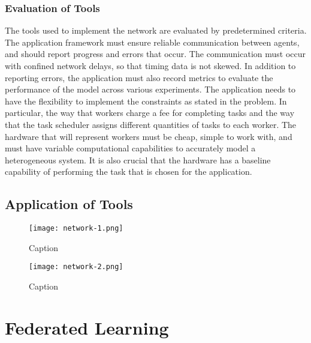 \documentclass[../mthe-493-final-project.tex]{subfiles}
\begin{document}
    \subsubsection{Evaluation of Tools}

    The tools used to implement the network are evaluated by predetermined criteria. The application framework must ensure reliable communication between agents, and should report progress and errors that occur. The communication must occur with confined network delays, so that timing data is not skewed. In addition to reporting errors, the application must also record metrics to evaluate the performance of the model across various experiments. The application needs to have the flexibility to implement the constraints as stated in the problem. In particular, the way that workers charge a fee for completing tasks and the way that the task scheduler assigns different quantities of tasks to each worker. The hardware that will represent workers must be cheap, simple to work with, and must have variable computational capabilities to accurately model a heterogeneous system. It is also crucial that the hardware has a baseline capability of performing the task that is chosen for the application.

    \subsection{Application of Tools}

    \begin{figure}
        \centering
        \texttt{[image: network-1.png]}
        \caption{Caption}
        \label{fig:network-flowchart}
    \end{figure}

    \begin{figure}
        \centering
        \texttt{[image: network-2.png]}
        \caption{Caption}
        \label{fig:network-sequence}
    \end{figure}

    \section{Federated Learning}
    \label{sec:Federate-Learning}
\end{document}
